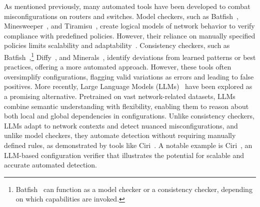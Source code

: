 As mentioned previously, many automated tools have been developed to combat misconfigurations on routers and switches.
Model checkers, such as Batfish~\cite{fogel2015general, batfish}, Minesweeper~\cite{beckett2017general}, and Tiramisu~\cite{abhashkumar2020tiramisu}, create logical models of network behavior to verify compliance with predefined policies. However, their reliance on manually specified policies limits scalability and adaptability~\cite{ye2020hoyan, birkner2021metha}. Consistency checkers, such as Batfish~\cite{batfish},\footnote{Batfish~\cite{batfish} can function as a model checker or a consistency checker, depending on which capabilities are invoked.} Diffy~\cite{kakarla2024diffy}, and Minerals~\cite{le2006minerals}, identify deviations from learned patterns or best practices, offering a more automated approach. However, these tools often oversimplify configurations, flagging valid variations as errors and leading to false positives. More recently, Large Language Models (LLMs)~\cite{bogdanov2024leveraging, chen2024automatic, wang2024identifying} have been explored as a promising alternative. Pretrained on vast network-related datasets, LLMs combine semantic understanding with flexibility, enabling them to reason about both local and global dependencies in configurations.
Unlike consistency checkers, LLMs adapt to network contexts and detect nuanced misconfigurations, and unlike model checkers, they automate detection without requiring manually defined rules, as demonstrated by tools like Ciri~\cite{lian2023configuration}.
A notable example is
Ciri~\cite{lian2023configuration}, an LLM-based configuration verifier that
illustrates the potential for scalable and accurate automated detection.

    


